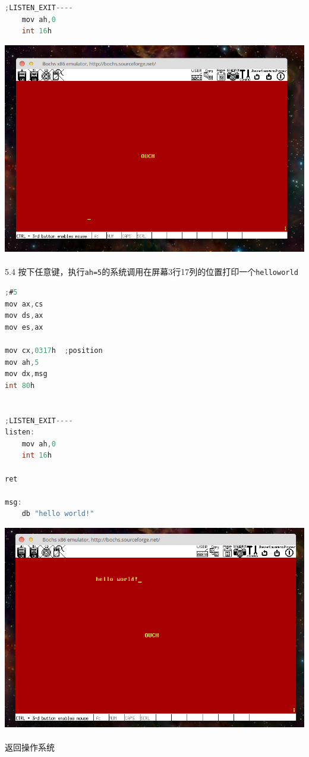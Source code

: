 \documentclass[a4paper]{article}
\begin{document}
{{{\begin{lstlisting}[language={C}]
;LISTEN_EXIT----
	mov ah,0
	int 16h


	\end{lstlisting}}
{\center\includegraphics[scale=0.45]{Illustrations/syscall1.png}}\\\\
5.4 按下任意键，执行\verb|ah=5|的系统调用在屏幕3行17列的位置打印一个\verb|helloworld|
{\scriptsize
\begin{lstlisting}[language={C}]
;#5
mov ax,cs
mov ds,ax
mov es,ax

mov cx,0317h  ;position
mov ah,5
mov dx,msg
int 80h


;LISTEN_EXIT----
listen:
	mov ah,0
	int 16h

ret

msg:
	db "hello world!"
	\end{lstlisting}}

{\center\includegraphics[scale=0.45]{Illustrations/syscall5.png}} \\\\
 返回操作系统\\\\

}}
\end{document}
